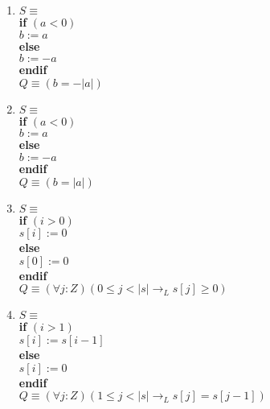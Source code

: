 \documentclass{article}
\begin{document}
\begin{enumerate}[label=\alph*)]
\item $S \equiv$\\
   \textbf{if} $( a < 0 )$\\
   \hspace*{6mm}$b := a$\\
   \textbf{else}\\
   \hspace*{6mm}$b := -a$\\
   \textbf{endif}\\

   $Q \equiv (b = -|a|)$\\
\item $S \equiv$\\
   \textbf{if} $( a < 0 )$\\
   \hspace*{6mm}$ b := a$\\
   \textbf{else}\\
   \hspace*{6mm}$ b := -a$\\
   \textbf{endif}\\

   $Q \equiv (b = |a|)$\\

\item $S \equiv$\\
   \textbf{if} $( i > 0 )$\\
   \hspace*{6mm}$ s [ i ] := 0$\\
   \textbf{else}\\
   \hspace*{6mm}$ s [ 0 ] := 0$\\
   \textbf{endif}\\

   $Q \equiv (\forall j :Z)(0 \leq j < |s| \rightarrow_L s[j] \geq 0)$\\
\item $S \equiv$\\
   \textbf{if} $( i > 1 )$\\
   \hspace*{6mm}$s [ i ] := s [ i -1]$\\
   \textbf{else}\\
   \hspace*{6mm}$ s [ i ] := 0$\\
   \textbf{endif}\\

   $Q \equiv (\forall j :Z)(1 \leq j < |s| \rightarrow_L s[j] = s[j - 1])$\\


\end{enumerate}
\end{document}
